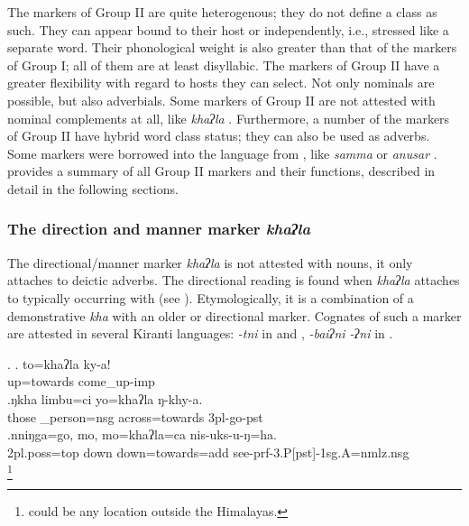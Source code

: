 The markers of Group II are quite heterogenous; they do not define a class as such. They can appear bound to their host or independently, i.e., stressed like a separate word. Their phonological weight is also greater than that of the markers of Group I; all of them are at least disyllabic.  The  markers of Group II  have a greater flexibility with regard to hosts they can select. Not only nominals are possible, but also adverbials. Some markers of Group II  are not attested with nominal complements at all, like \emph{khaʔla} .  Furthermore, a number of the markers of Group II have hybrid word class status; they can also be used as adverbs. Some markers were borrowed into the language from , like \emph{samma}  or \emph{anusar} .   provides a summary of all Group II markers and their functions, described in detail in the following sections.

  	
	
\subsubsection{The direction and  manner marker  \emph{khaʔla}}

The directional/manner marker \emph{khaʔla}   is not attested with nouns, it only attaches to deictic adverbs. The directional reading is found when \emph{khaʔla} attaches to  typically occurring with  (see \Next). Etymologically, it is a combination of a demonstrative \emph{kha} with an older  or directional  marker. Cognates of such a marker are attested in several Kiranti languages: \emph{-tni} in  \citep[84]{Doornenbal2009A-grammar} and  \citep{Sharma2005Case}, \emph{-baiʔni \ti -ʔni} in  \citep[83]{Schikowski2012_Morphology}. %

\ex. \ag. to=khaʔla ky-a!\\
up=towards come\_up{\sc -imp}\\
\bg.ŋkha limbu=ci             yo=khaʔla  ŋ-khy-a.\\
those \_person{\sc =nsg} across=towards {\sc 3pl-}go{\sc -pst}\\
 
\bg.nniŋga=go,          mo,  mo=khaʔla=ca        nis-uks-u-ŋ=ha.\\
{\sc 2pl.poss=top} down down=towards{\sc =add} see{\sc -prf-3.P[pst]-1sg.A=nmlz.nsg}\\
\footnote{ could be any location outside the Himalayas.}

